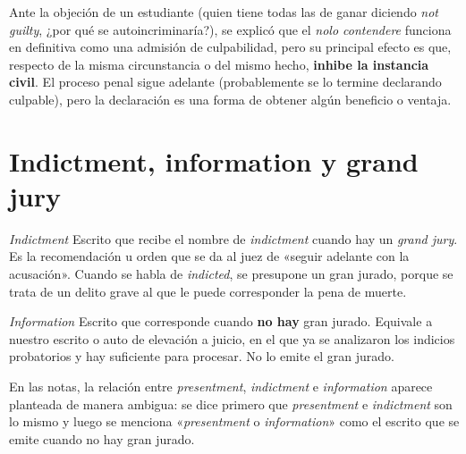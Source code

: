 \documentclass[12pt,oneside]{book}
\begin{document}
Ante la objeción de un estudiante (quien tiene todas las de ganar diciendo \textit{not guilty}, ¿por qué se autoincriminaría?), se explicó que el \textit{nolo contendere} funciona en definitiva como una admisión de culpabilidad, pero su principal efecto es que, respecto de la misma circunstancia o del mismo hecho, \textbf{inhibe la instancia civil}. El proceso penal sigue adelante (probablemente se lo termine declarando culpable), pero la declaración es una forma de obtener algún beneficio o ventaja.

\section{Indictment, information y grand jury}

\begin{definition}{\textit{Indictment}}
Escrito que recibe el nombre de \textit{indictment} cuando hay un \textit{grand jury}. Es la recomendación u orden que se da al juez de «seguir adelante con la acusación». Cuando se habla de \textit{indicted}, se presupone un gran jurado, porque se trata de un delito grave al que le puede corresponder la pena de muerte.
\end{definition}

\begin{definition}{\textit{Information}}
Escrito que corresponde cuando \textbf{no hay} gran jurado. Equivale a nuestro escrito o auto de elevación a juicio, en el que ya se analizaron los indicios probatorios y hay suficiente para procesar. No lo emite el gran jurado.
\end{definition}


\begin{note}
En las notas, la relación entre \textit{presentment}, \textit{indictment} e \textit{information} aparece planteada de manera ambigua: se dice primero que \textit{presentment} e \textit{indictment} son lo mismo y luego se menciona «\textit{presentment} o \textit{information}» como el escrito que se emite cuando no hay gran jurado.
\end{note}
\end{document}
